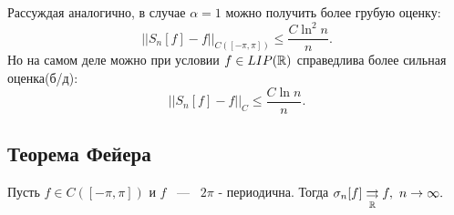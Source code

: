 \begin{remark}
    Рассуждая аналогично, в случае $\alpha = 1$ можно получить более грубую оценку:
    $$
    ||S_n[f] - f||_{C([-\pi, \pi])} \le \frac{C\ln^2n}{n}.
    $$
    Но на самом деле можно при условии $f \in LIP(\mathbb{R})$ справедлива более сильная оценка(б/д):
    $$
    ||S_n[f] - f||_C \le \frac{C \ln n}{n}.
    $$
\end{remark}

\subsection{Теорема Фейера}
\begin{theorem}
    Пусть $f \in C([-\pi, \pi])$ и $f$ ~---~ $2\pi$ - периодична. Тогда $\sigma_n[f] \underset{\mathbb{R}}{\rightrightarrows} f, \ n \rightarrow \infty.$
\end{theorem}
